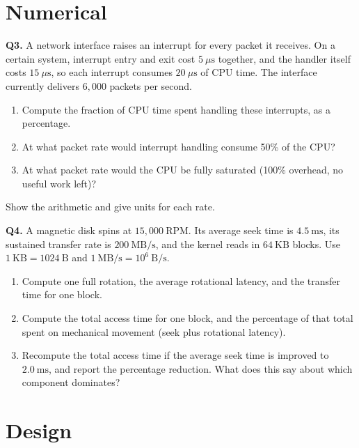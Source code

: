 \documentclass[11pt]{article}
\begin{document}
\section{Numerical}

\textbf{Q3.} A network interface raises an interrupt for every packet it receives. On a certain system, interrupt entry and exit cost $5\ \mu\text{s}$ together, and the handler itself costs $15\ \mu\text{s}$, so each interrupt consumes $20\ \mu\text{s}$ of CPU time. The interface currently delivers $6{,}000$ packets per second.
\begin{enumerate}
  \item[(a)] Compute the fraction of CPU time spent handling these interrupts, as a percentage.
  \item[(b)] At what packet rate would interrupt handling consume 50\% of the CPU?
  \item[(c)] At what packet rate would the CPU be fully saturated (100\% overhead, no useful work left)?
\end{enumerate}
Show the arithmetic and give units for each rate.

\textbf{Q4.} A magnetic disk spins at $15{,}000\ \text{RPM}$. Its average seek time is $4.5\ \text{ms}$, its sustained transfer rate is $200\ \text{MB/s}$, and the kernel reads in $64\ \text{KB}$ blocks. Use $1\ \text{KB} = 1024\ \text{B}$ and $1\ \text{MB/s} = 10^6\ \text{B/s}$.
\begin{enumerate}
  \item[(a)] Compute one full rotation, the average rotational latency, and the transfer time for one block.
  \item[(b)] Compute the total access time for one block, and the percentage of that total spent on mechanical movement (seek plus rotational latency).
  \item[(c)] Recompute the total access time if the average seek time is improved to $2.0\ \text{ms}$, and report the percentage reduction. What does this say about which component dominates?
\end{enumerate}

\section{Design}
\end{document}
